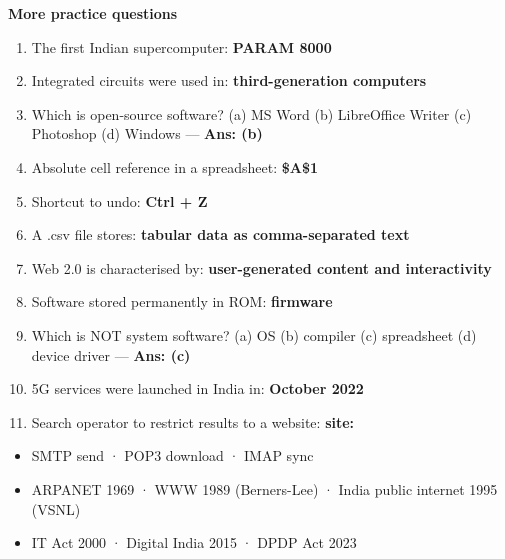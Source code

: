 \textbf{More practice questions}

\begin{enumerate}
\def\labelenumi{\arabic{enumi}.}
\setcounter{enumi}{23}
\tightlist
\item
  The first Indian supercomputer: \textbf{PARAM 8000}
\item
  Integrated circuits were used in: \textbf{third-generation computers}
\item
  Which is open-source software? (a) MS Word (b) LibreOffice Writer (c) Photoshop (d) Windows --- \textbf{Ans: (b)}
\item
  Absolute cell reference in a spreadsheet: \textbf{\$A\$1}
\item
  Shortcut to undo: \textbf{Ctrl + Z}
\item
  A .csv file stores: \textbf{tabular data as comma-separated text}
\item
  Web 2.0 is characterised by: \textbf{user-generated content and interactivity}
\item
  Software stored permanently in ROM: \textbf{firmware}
\item
  Which is NOT system software? (a) OS (b) compiler (c) spreadsheet (d) device driver --- \textbf{Ans: (c)}
\item
  5G services were launched in India in: \textbf{October 2022}
\item
  Search operator to restrict results to a website: \textbf{site:}
\end{enumerate}

\begin{revbox}

\begin{itemize}
\tightlist
\item
  SMTP send · POP3 download · IMAP sync
\item
  ARPANET 1969 · WWW 1989 (Berners-Lee) · India public internet 1995 (VSNL)
\item
  IT Act 2000 · Digital India 2015 · DPDP Act 2023
\end{itemize}

\end{revbox}
